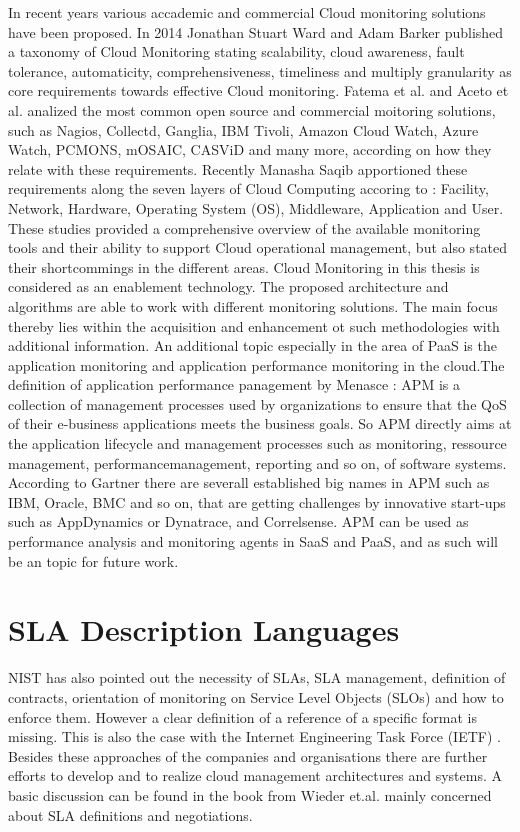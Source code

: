 In recent years various accademic and commercial Cloud monitoring solutions have been proposed. In 2014 Jonathan Stuart Ward and Adam Barker \cite{ward2014observing} published a taxonomy of Cloud Monitoring stating scalability, cloud awareness, fault tolerance, automaticity, comprehensiveness, timeliness and multiply granularity as core requirements towards effective Cloud monitoring. Fatema et al. \cite{fatema2014survey} and Aceto et al. \cite{aceto2013cloud} analized the most common open source and commercial moitoring solutions, such as Nagios, Collectd, Ganglia, IBM Tivoli, Amazon Cloud Watch, Azure Watch, PCMONS, mOSAIC, CASViD and many more, according on how they relate with these requirements. Recently Manasha Saqib \cite{saqib2017cloud} apportioned these requirements along the seven layers of Cloud Computing accoring to \cite{CSA3.0} \cite{spring2011monitoring1} \cite{spring2011monitoring2}: Facility, Network, Hardware, Operating System (OS), Middleware, Application and User. These studies provided a comprehensive overview of the available monitoring tools and their ability to support Cloud operational management, but also stated their shortcommings in the different areas. Cloud Monitoring in this thesis is considered as an enablement technology. The proposed architecture and algorithms are able to work with different monitoring solutions. The main focus thereby lies within the acquisition and enhancement ot such methodologies with additional information.
An additional topic especially in the area of PaaS is the application monitoring and application performance monitoring in the cloud.The definition of application performance panagement by Menasce \cite{menasce2002load}: APM is a collection of management processes used by organizations to ensure that the QoS of their e-business applications meets the business goals. So APM directly aims at the application lifecycle and management processes such as monitoring, ressource management, performancemanagement, reporting and so on, of software systems. According to Gartner \cite{GartnerAPM} there are severall established big names in APM such as IBM, Oracle, BMC and so on, that are getting challenges by innovative start-ups such as AppDynamics or Dynatrace, and Correlsense. APM can be used as performance analysis and monitoring agents in SaaS and PaaS, and as such will be an topic for future work.


\section{SLA Description Languages}
NIST \cite{Liu2011} has also pointed out the necessity of SLAs, SLA management, definition of contracts, orientation of monitoring on Service Level Objects (SLOs) and how to enforce them. However a clear definition of a reference of a specific format is missing. This is also the case with the Internet Engineering Task Force (IETF) \cite{Khasnabish2010}. Besides these approaches of the companies and organisations there are further efforts to develop and to realize cloud management architectures and systems. A basic discussion can be found in the book from Wieder et.al. \cite{Wieder2011} mainly concerned about SLA definitions and negotiations.

